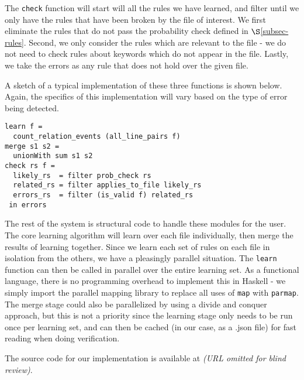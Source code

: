 The \lstinline{check} function will start will all the rules we have learned, and filter until we only have the rules that have been broken by the file of interest.
We first eliminate the rules that do not pass the probability check defined in $\S$\ref{subsec-rules}.
Second, we only consider the rules which are relevant to the file - we do not need to check rules about keywords which do not appear in the file.
Lastly, we take the errors as any rule that does not hold over the given file.

A sketch of a typical implementation of these three functions is shown below. Again, the specifics of this implementation will vary based on the type of error being detected. 

\begin{lstlisting}
learn f = 
  count_relation_events (all_line_pairs f)
merge s1 s2 = 
  unionWith sum s1 s2
check rs f = 
  likely_rs  = filter prob_check rs
  related_rs = filter applies_to_file likely_rs
  errors_rs  = filter (is_valid f) related_rs
 in errors
\end{lstlisting}

The rest of the system is structural code to handle these modules for the user. The core learning algorithm will learn over each file individually, then merge the results of learning together. 
Since we learn each set of rules on each file in isolation from the others, we have a pleasingly parallel situation.
The \lstinline{learn} function can then be called in parallel over the entire learning set.
As a functional language, there is no programming overhead to implement this in Haskell - we simply import the parallel mapping library \cite{parallel} to replace all uses of  \lstinline{map} with \lstinline{parmap}.
The merge stage could also be parallelized by using a divide and conquer approach, but this is not a priority since the learning stage only needs to be run once per learning set, and can then be cached (in our case, as a .json file) for fast reading when doing verification.

The source code for our implementation is available at {\em (URL omitted for blind review)}.